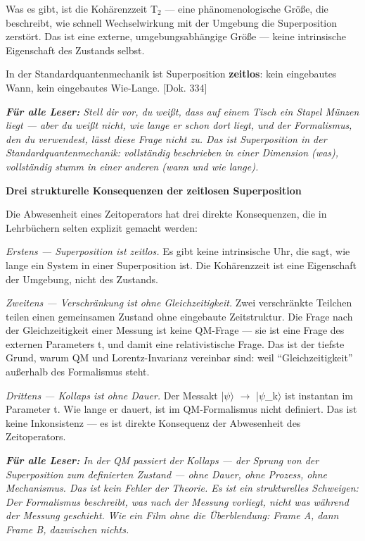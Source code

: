 \documentclass[11pt,oneside]{book}
\newenvironment{laierspur}{%
  \par\vspace{4pt}%
  \noindent\small\itshape\color{blue!60!black}%
  \textbf{Für alle Leser:}\enspace\ignorespaces}{%
  \par\vspace{4pt}\normalsize\normalfont\normalcolor}
\begin{document}
Was es gibt, ist die Kohärenzzeit T$_2$ — eine phänomenologische Größe,
die beschreibt, wie schnell Wechselwirkung mit der Umgebung die
Superposition zerstört. Das ist eine externe, umgebungsabhängige
Größe — keine intrinsische Eigenschaft des Zustands selbst.


In der Standardquantenmechanik ist Superposition \textbf{zeitlos}: kein
eingebautes Wann, kein eingebautes Wie-Lange. [Dok. 334]


\begin{laierspur}
Stell dir vor, du weißt, dass auf einem Tisch ein
Stapel Münzen liegt — aber du weißt nicht, wie lange er schon
dort liegt, und der Formalismus, den du verwendest, lässt diese
Frage nicht zu. Das ist Superposition in der Standardquantenmechanik:
vollständig beschrieben in einer Dimension (was), vollständig
stumm in einer anderen (wann und wie lange).
\end{laierspur}

\textbf{Drei strukturelle Konsequenzen der zeitlosen Superposition}


Die Abwesenheit eines Zeitoperators hat drei direkte Konsequenzen,
die in Lehrbüchern selten explizit gemacht werden:


\textit{Erstens — Superposition ist zeitlos.} Es gibt keine intrinsische Uhr,
die sagt, wie lange ein System in einer Superposition ist. Die
Kohärenzzeit ist eine Eigenschaft der Umgebung, nicht des Zustands.


\textit{Zweitens — Verschränkung ist ohne Gleichzeitigkeit.} Zwei verschränkte
Teilchen teilen einen gemeinsamen Zustand ohne eingebaute Zeitstruktur.
Die Frage nach der Gleichzeitigkeit einer Messung ist keine QM-Frage —
sie ist eine Frage des externen Parameters t, und damit eine relativistische
Frage. Das ist der tiefste Grund, warum QM und Lorentz-Invarianz vereinbar
sind: weil \enquote{Gleichzeitigkeit} außerhalb des Formalismus steht.


\textit{Drittens — Kollaps ist ohne Dauer.} Der Messakt |$\psi\rangle$ $\to$ |$\psi$\_k$\rangle$ ist
instantan im Parameter t. Wie lange er dauert, ist im QM-Formalismus
nicht definiert. Das ist keine Inkonsistenz — es ist direkte Konsequenz
der Abwesenheit des Zeitoperators.


\begin{laierspur}
In der QM passiert der Kollaps — der Sprung von der
Superposition zum definierten Zustand — ohne Dauer, ohne Prozess,
ohne Mechanismus. Das ist kein Fehler der Theorie. Es ist ein
strukturelles Schweigen: Der Formalismus beschreibt, was nach
der Messung vorliegt, nicht was während der Messung geschieht.
Wie ein Film ohne die Überblendung: Frame A, dann Frame B,
dazwischen nichts.
\end{laierspur}
\end{document}
